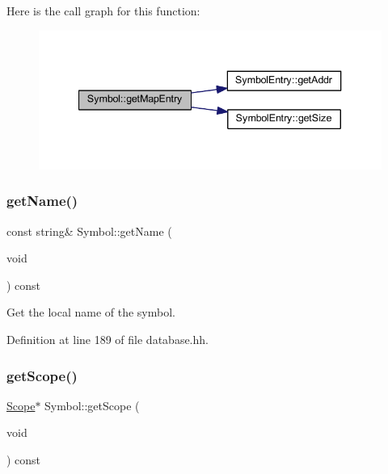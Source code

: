 Here is the call graph for this function\+:
\nopagebreak
\begin{figure}[H]
\begin{center}
\leavevmode
\includegraphics[width=340pt]{class_symbol_a0f86b85ac74fc36f1df80b48b658af1c_cgraph}
\end{center}
\end{figure}
\mbox{\label{class_symbol_a09581886eebb89084c4e1e20c2517784}} 
\subsubsection{\texorpdfstring{getName()}{getName()}}
{\footnotesize\ttfamily const string\& Symbol\+::get\+Name (\begin{DoxyParamCaption}\item[{void}]{ }\end{DoxyParamCaption}) const\hspace{0.3cm}{\ttfamily [inline]}}



Get the local name of the symbol. 



Definition at line 189 of file database.\+hh.

\mbox{\label{class_symbol_af2652f9225cfb08f99f0f8c9dca37db1}} 
\subsubsection{\texorpdfstring{getScope()}{getScope()}}
{\footnotesize\ttfamily \mbox{\hyperlink{class_scope}{Scope}}$\ast$ Symbol\+::get\+Scope (\begin{DoxyParamCaption}\item[{void}]{ }\end{DoxyParamCaption}) const\hspace{0.3cm}{\ttfamily [inline]}}




